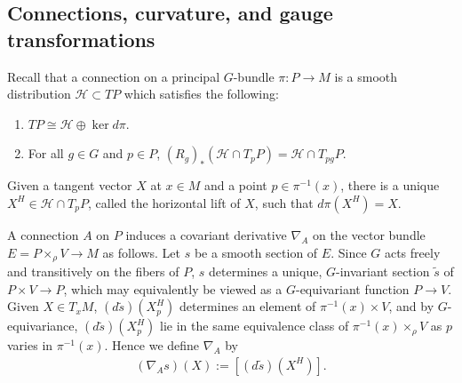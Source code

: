 \documentclass[12pt]{amsart}
\renewcommand{\1}{{\mathbf 1}}
\newcommand{\gothg}{{\mathfrak g}}
\theoremstyle{others}
\numberwithin{equation}{section}
\begin{document}

\vspace{5mm}

\subsection{Connections, curvature, and gauge transformations}

Recall that a connection on a principal \(G\)-bundle \(\pi : P \to M\) is a smooth distribution \(\mathcal{H} \subset TP\) which satisfies the following:
\begin{enumerate}
    \item \(TP \cong \mathcal{H} \oplus \ker{d\pi}\).
    \item For all \(g \in G\) and \(p \in P\), \((R_g)_\ast(\mathcal{H} \cap T_pP) = \mathcal{H} \cap T_{pg} P\).
\end{enumerate}
Given a tangent vector \(X\) at \(x \in M\) and a point \(p \in \pi^{-1}(x)\), there is a unique \(X^H \in \mathcal{H} \cap T_pP\), called the horizontal lift of \(X\), such that \(d\pi(X^H) = X\). \par 
A connection $A$ on \(P\) induces a covariant derivative \(\nabla_A\) on the vector bundle $E = P \times_\rho V \to M$ as follows. Let \(s\) be a smooth section of \(E\). Since \(G\) acts freely and transitively on the fibers of \(P\), \(s\) determines a unique, \(G\)-invariant section \(\tilde{s}\) of \(P \times V \to P\), which may equivalently be viewed as a \(G\)-equivariant function \(P \to V\). Given \(X \in T_xM\), \((d\tilde{s})(X_p^H)\) determines an element of \(\pi^{-1}(x) \times V\), and by \(G\)-equivariance, \((d\tilde{s})(X_p^H)\) lie in the same equivalence class of \(\pi^{-1}(x) \times_\rho V\) as \(p\) varies in \(\pi^{-1}(x)\). Hence we define \(\nabla_A\) by
\begin{align*}
    (\nabla_A s)(X) := [(d\tilde{s})(X^H)].
\end{align*} \par
\end{document}
